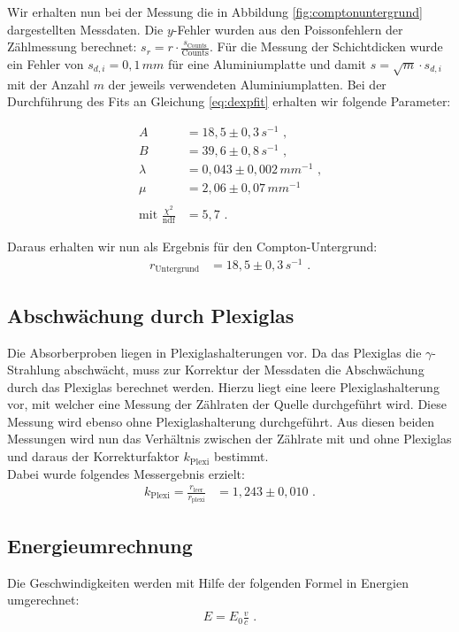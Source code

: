 Wir erhalten nun bei der Messung die in Abbildung \ref{fig:comptonuntergrund} dargestellten Messdaten. Die $y$-Fehler wurden aus den Poissonfehlern der Zählmessung berechnet: $s_r=r\cdot\frac{s_\text{Counts}}{\mathrm{Counts}}$. Für die Messung der Schichtdicken wurde ein Fehler von $s_{d,i}=0,1\,\si{mm}$ für eine Aluminiumplatte und damit $s=\sqrt{m}\cdot s_{d,i}$ mit der Anzahl $m$ der jeweils verwendeten Aluminiumplatten. Bei der Durchführung des Fits an Gleichung \ref{eq:dexpfit} erhalten wir folgende Parameter:

\begin{align*}
		A&=18,5\pm0,3\,\si{s^{-1}}\text{ ,}\\
		B&=39,6\pm0,8\,\si{s^{-1}}\text{ ,}\\
		\lambda&=0,043\pm0,002\,\si{mm^{-1}}\text{ ,}\\
		\mu&=2,06\pm0,07\,\si{mm^{-1}}\\
		\ \\
		\text{mit }\frac{\chi^2}{\mathrm{ndf}}&=5,7\text{ .}
\end{align*}

Daraus erhalten wir nun als Ergebnis für den Compton-Untergrund:
\begin{align}
	r_\text{Untergrund}&=18,5\pm0,3\,\si{s^{-1}}\text{ .}
\end{align}

\subsection{Abschwächung durch Plexiglas}

Die Absorberproben liegen in Plexiglashalterungen vor. Da das Plexiglas die $\gamma$-Strahlung abschwächt, muss zur Korrektur der Messdaten die Abschwächung durch das Plexiglas berechnet werden. Hierzu liegt eine leere Plexiglashalterung vor, mit welcher eine Messung der Zählraten der Quelle durchgeführt wird. Diese Messung wird ebenso ohne Plexiglashalterung durchgeführt. Aus diesen beiden Messungen wird nun das Verhältnis zwischen der Zählrate mit und ohne Plexiglas und daraus der Korrekturfaktor $k_\text{Plexi}$ bestimmt.\\

Dabei wurde folgendes Messergebnis erzielt:
\begin{align}
	k_\text{Plexi}=\frac{r_\text{leer}}{r_\text{plexi}}&=1,243\pm0,010\text{ .}
\end{align}

\subsection{Energieumrechnung}
Die Geschwindigkeiten werden mit Hilfe der folgenden Formel in Energien umgerechnet:
\begin{align}
	E=E_0\frac{v}{c}\text{ .}\label{vtoE}
\end{align}

